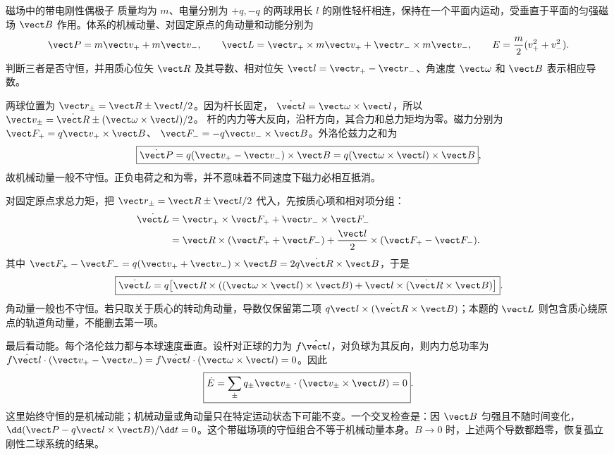 \begin{practicebox}{磁场中的带电刚性偶极子}
质量均为 $m$、电量分别为 $+q,-q$ 的两球用长 $l$ 的刚性轻杆相连，保持在一个平面内运动，受垂直于平面的匀强磁场 $\vect B$ 作用。体系的机械动量、对固定原点的角动量和动能分别为
\[
 \vect P=m\vect v_++m\vect v_-,\qquad
 \vect L=\vect r_+\times m\vect v_++\vect r_-\times m\vect v_-,
 \qquad E=\frac m2(v_+^2+v_-^2).
\]
判断三者是否守恒，并用质心位矢 $\vect R$ 及其导数、相对位矢 $\vect l=\vect r_+-\vect r_-$、角速度 $\vect\omega$ 和 $\vect B$ 表示相应导数。
\label{r2ch02:pr:014}
\begin{solution}
两球位置为 $\vect r_\pm=\vect R\pm\vect l/2$。因为杆长固定，
$\dot{\vect l}=\vect\omega\times\vect l$，所以
$\vect v_\pm=\dot{\vect R}\pm(\vect\omega\times\vect l)/2$。
杆的内力等大反向，沿杆方向，其合力和总力矩均为零。磁力分别为
$\vect F_+=q\vect v_+\times\vect B$、
$\vect F_-=-q\vect v_-\times\vect B$。外洛伦兹力之和为
\[
 \boxed{\dot{\vect P}=q(\vect v_+-\vect v_-)\times\vect B
 =q(\vect\omega\times\vect l)\times\vect B},
\]
故机械动量一般不守恒。正负电荷之和为零，并不意味着不同速度下磁力必相互抵消。

对固定原点求总力矩，把 $\vect r_\pm=\vect R\pm\vect l/2$ 代入，先按质心项和相对项分组：
\[
\begin{aligned}
 \dot{\vect L}
 &=\vect r_+\times\vect F_++\vect r_-\times\vect F_-\\
 &=\vect R\times(\vect F_++\vect F_-)
   +\frac{\vect l}{2}\times(\vect F_+-\vect F_-).
\end{aligned}
\]
其中
$\vect F_+-\vect F_-=q(\vect v_++\vect v_-)\times\vect B
=2q\dot{\vect R}\times\vect B$，于是
\[
 \boxed{\dot{\vect L}=q\!\left[
 \vect R\times((\vect\omega\times\vect l)\times\vect B)
 +\vect l\times(\dot{\vect R}\times\vect B)
 \right]}.
\]
角动量一般也不守恒。若只取关于质心的转动角动量，导数仅保留第二项
$q\vect l\times(\dot{\vect R}\times\vect B)$；本题的 $\vect L$ 则包含质心绕原点的轨道角动量，不能删去第一项。

最后看动能。每个洛伦兹力都与本球速度垂直。设杆对正球的力为 $f\hat{\vect l}$，对负球为其反向，则内力总功率为
$f\hat{\vect l}\cdot(\vect v_+-\vect v_-)
=f\hat{\vect l}\cdot(\vect\omega\times\vect l)=0$。因此
\[
 \boxed{\dot E=\sum_\pm q_\pm\vect v_\pm\cdot(\vect v_\pm\times\vect B)=0}.
\]
这里始终守恒的是机械动能；机械动量或角动量只在特定运动状态下可能不变。一个交叉检查是：因 $\vect B$ 匀强且不随时间变化，
$\dd(\vect P-q\vect l\times\vect B)/\dd t=0$。这个带磁场项的守恒组合不等于机械动量本身。$B\to0$ 时，上述两个导数都趋零，恢复孤立刚性二球系统的结果。
\end{solution}
\end{practicebox}

